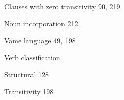 \begin{multicols}{2}
\begin{styleindexii}
Clauses with zero transitivity   90, 219
\end{styleindexii}

\begin{styleindexii}
Noun incorporation  212
\end{styleindexii}

\begin{styleindexi}
Vame language  49, 198
\end{styleindexi}

\begin{styleindexi}
Verb classification
\end{styleindexi}

\begin{styleindexii}
Structural  128
\end{styleindexii}

\begin{styleindexii}
Transitivity  198
\end{styleindexii}\end{multicols}

\setcounter{page}{1}

